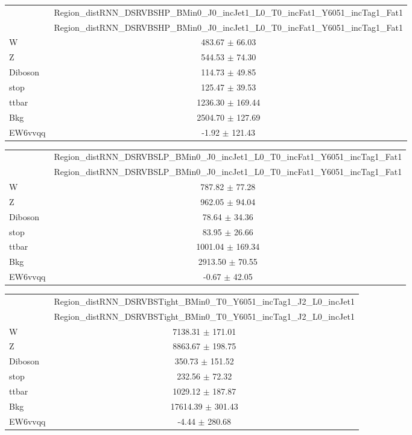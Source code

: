 \documentclass{article}
\begin{document}
\begin{table}
\centering
\small
\begin{tabular}{l|c|}
\cline{2-2}
 & \multicolumn{1}{c|}{Region\_distRNN\_DSRVBSHP\_BMin0\_J0\_incJet1\_L0\_T0\_incFat1\_Y6051\_incTag1\_Fat1}\\
\cline{2-2}
 & \multicolumn{1}{c|}{Region\_distRNN\_DSRVBSHP\_BMin0\_J0\_incJet1\_L0\_T0\_incFat1\_Y6051\_incTag1\_Fat1}\\ \hline
W & 483.67 $\pm$ 66.03\\
Z & 544.53 $\pm$ 74.30\\
Diboson & 114.73 $\pm$ 49.85\\
stop & 125.47 $\pm$ 39.53\\
ttbar & 1236.30 $\pm$ 169.44\\
\hline
Bkg & 2504.70 $\pm$ 127.69\\
\hline
EW6vvqq & -1.92 $\pm$ 121.43\\
\end{tabular}
\end{table}


\begin{table}
\centering
\small
\begin{tabular}{l|c|}
\cline{2-2}
 & \multicolumn{1}{c|}{Region\_distRNN\_DSRVBSLP\_BMin0\_J0\_incJet1\_L0\_T0\_incFat1\_Y6051\_incTag1\_Fat1}\\
\cline{2-2}
 & \multicolumn{1}{c|}{Region\_distRNN\_DSRVBSLP\_BMin0\_J0\_incJet1\_L0\_T0\_incFat1\_Y6051\_incTag1\_Fat1}\\ \hline
W & 787.82 $\pm$ 77.28\\
Z & 962.05 $\pm$ 94.04\\
Diboson & 78.64 $\pm$ 34.36\\
stop & 83.95 $\pm$ 26.66\\
ttbar & 1001.04 $\pm$ 169.34\\
\hline
Bkg & 2913.50 $\pm$ 70.55\\
\hline
EW6vvqq & -0.67 $\pm$ 42.05\\
\end{tabular}
\end{table}


\begin{table}
\centering
\small
\begin{tabular}{l|c|}
\cline{2-2}
 & \multicolumn{1}{c|}{Region\_distRNN\_DSRVBSTight\_BMin0\_T0\_Y6051\_incTag1\_J2\_L0\_incJet1}\\
\cline{2-2}
 & \multicolumn{1}{c|}{Region\_distRNN\_DSRVBSTight\_BMin0\_T0\_Y6051\_incTag1\_J2\_L0\_incJet1}\\ \hline
W & 7138.31 $\pm$ 171.01\\
Z & 8863.67 $\pm$ 198.75\\
Diboson & 350.73 $\pm$ 151.52\\
stop & 232.56 $\pm$ 72.32\\
ttbar & 1029.12 $\pm$ 187.87\\
\hline
Bkg & 17614.39 $\pm$ 301.43\\
\hline
EW6vvqq & -4.44 $\pm$ 280.68\\
\end{tabular}
\end{table}
\end{document}
